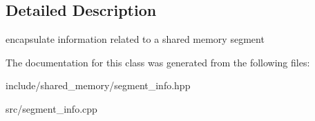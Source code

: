 \subsection{Detailed Description}
encapsulate information related to a shared memory segment 

The documentation for this class was generated from the following files\+:\begin{DoxyCompactItemize}
\item 
include/shared\+\_\+memory/segment\+\_\+info.\+hpp\item 
src/segment\+\_\+info.\+cpp\end{DoxyCompactItemize}
